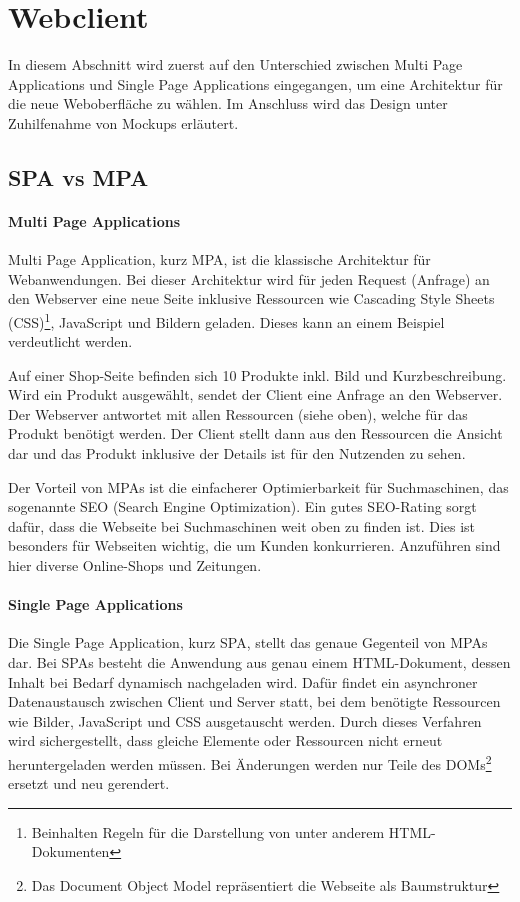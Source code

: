 \section{Webclient} \label{sec:Webclient}
In diesem Abschnitt wird zuerst auf den Unterschied zwischen Multi Page Applications und Single Page Applications eingegangen, um eine Architektur für die neue Weboberfläche zu wählen. Im Anschluss wird das Design unter Zuhilfenahme von Mockups erläutert.

\subsection{SPA vs MPA} \label{subsec:SPA_vs_MPA}

\paragraph{Multi Page Applications} \label{para:Multi_Page_Applications}
Multi Page Application, kurz MPA, ist die klassische Architektur für Webanwendungen. Bei dieser Architektur wird für jeden Request (Anfrage) an den Webserver eine neue Seite inklusive Ressourcen wie Cascading Style Sheets (CSS)\footnote{Beinhalten Regeln für die Darstellung von unter anderem HTML-Dokumenten}, JavaScript und Bildern geladen. Dieses kann an einem Beispiel verdeutlicht werden.

Auf einer Shop-Seite befinden sich 10 Produkte inkl. Bild und Kurzbeschreibung. Wird ein Produkt ausgewählt, sendet der Client eine Anfrage an den Webserver. Der Webserver antwortet mit allen Ressourcen (siehe oben), welche für das Produkt benötigt werden. Der Client stellt dann aus den Ressourcen die Ansicht dar und das Produkt inklusive der Details ist für den Nutzenden zu sehen.

Der Vorteil von MPAs ist die einfacherer Optimierbarkeit für Suchmaschinen, das sogenannte SEO (Search Engine Optimization). Ein gutes SEO-Rating sorgt dafür, dass die Webseite bei Suchmaschinen weit oben zu finden ist. Dies ist besonders für Webseiten wichtig, die um Kunden konkurrieren. Anzuführen sind hier diverse Online-Shops und Zeitungen.

\paragraph{Single Page Applications} \label{para:Single_Page_Applications}
Die Single Page Application, kurz SPA, stellt das genaue Gegenteil von MPAs dar. Bei SPAs besteht die Anwendung aus genau einem HTML-Dokument, dessen Inhalt bei Bedarf dynamisch nachgeladen wird. Dafür findet ein asynchroner Datenaustausch zwischen Client und Server statt, bei dem benötigte Ressourcen wie Bilder, JavaScript und CSS ausgetauscht werden. Durch dieses Verfahren wird sichergestellt, dass gleiche Elemente oder Ressourcen nicht erneut heruntergeladen werden müssen. Bei Änderungen werden nur Teile des DOMs\footnote{Das Document Object Model repräsentiert die Webseite als Baumstruktur} ersetzt und neu gerendert.

